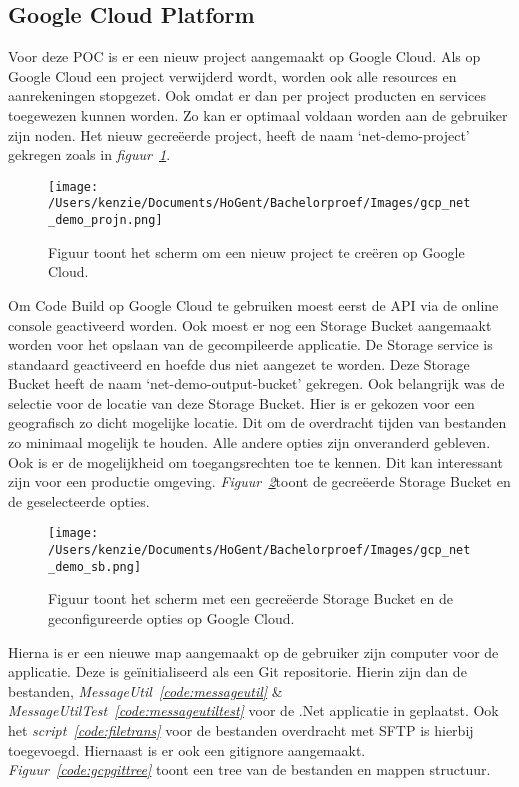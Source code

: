 \subsection{Google Cloud Platform}
\label{sec:VergelijkingGCP}
Voor deze POC is er een nieuw project aangemaakt op Google Cloud. Als op Google Cloud een project verwijderd wordt, worden ook alle resources en aanrekeningen stopgezet. Ook omdat er dan per project producten en services toegewezen kunnen worden. Zo kan er optimaal voldaan worden aan de gebruiker zijn noden. Het nieuw gecreëerde project, heeft de naam ‘net-demo-project’ gekregen zoals in \emph{figuur~\ref{fig:GCP_POC_projn}}.

\begin{figure}[!htbp]
    \centering
    \texttt{[image: /Users/kenzie/Documents/HoGent/Bachelorproef/Images/gcp\_net\_demo\_projn.png]}
    \caption{Figuur toont het scherm om een nieuw project te creëren op Google Cloud.}
    \label{fig:GCP_POC_projn}
\end{figure}

Om Code Build op Google Cloud te gebruiken moest eerst de API via de online console geactiveerd worden. Ook moest er nog een Storage Bucket aangemaakt worden voor het opslaan van de gecompileerde applicatie. De Storage service is standaard geactiveerd en hoefde dus niet aangezet te worden. Deze Storage Bucket heeft de naam ‘net-demo-output-bucket’ gekregen. Ook belangrijk was de selectie voor de locatie van deze Storage Bucket. Hier is er gekozen voor een geografisch zo dicht mogelijke locatie. Dit om de overdracht tijden van bestanden zo minimaal mogelijk te houden. Alle andere opties zijn onveranderd gebleven. Ook is er de mogelijkheid om toegangsrechten toe te kennen. Dit kan interessant zijn voor een productie omgeving. \emph{Figuur~\ref{fig:GCP_POC_sb}}toont de gecreëerde Storage Bucket en de geselecteerde opties.

\begin{figure}[!htbp]
    \centering
    \texttt{[image: /Users/kenzie/Documents/HoGent/Bachelorproef/Images/gcp\_net\_demo\_sb.png]}
    \caption{Figuur toont het scherm met een gecreëerde Storage Bucket en de geconfigureerde opties op Google Cloud.}
    \label{fig:GCP_POC_sb}
\end{figure}

Hierna is er een nieuwe map aangemaakt op de gebruiker zijn computer voor de applicatie. Deze is geïnitialiseerd als een Git repositorie. Hierin zijn dan de bestanden, \emph{MessageUtil~\ref{code:messageutil}} \& \emph{MessageUtilTest~\ref{code:messageutiltest}} voor de .Net applicatie in geplaatst. Ook het \emph{script~\ref{code:filetrans}} voor de bestanden overdracht met SFTP is hierbij toegevoegd. Hiernaast is er ook een gitignore aangemaakt. \emph{Figuur~\ref{code:gcpgittree}} toont een tree van de bestanden en mappen structuur.

